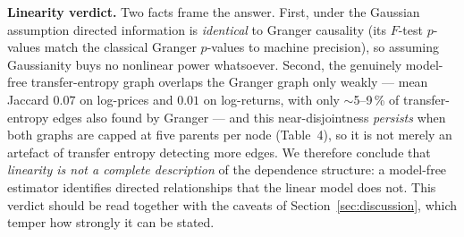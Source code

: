 \documentclass[11pt,a4paper]{article}
\begin{document}
\noindent\textbf{Linearity verdict.}
Two facts frame the answer. First, under the Gaussian assumption directed
information is \emph{identical} to Granger causality (its $F$-test $p$-values match
the classical Granger $p$-values to machine precision), so assuming Gaussianity
buys no nonlinear power whatsoever. Second, the genuinely model-free
transfer-entropy graph overlaps the Granger graph only weakly --- mean Jaccard
$0.07$ on log-prices and $0.01$ on log-returns, with only $\sim$5--9\,\% of
transfer-entropy edges also found by Granger --- and this near-disjointness
\emph{persists} when both graphs are capped at five parents per node (Table~4), so
it is not merely an artefact of transfer entropy detecting more edges. We therefore
conclude that \emph{linearity is not a complete description} of the dependence
structure: a model-free estimator identifies directed relationships that the linear
model does not. This verdict should be read together with the caveats of
Section~\ref{sec:discussion}, which temper how strongly it can be stated.

\end{document}
